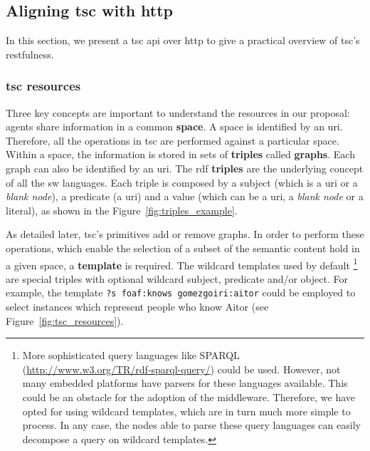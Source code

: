 \subsection{Aligning \acs{tsc} with \acs{http}}
\label{sec:align_tsc_http}


In this section, we present a \ac{tsc} \acs{api} over \ac{http} to give a practical overview of \ac{tsc}'s \acs{rest}fulness.

\subsubsection{\acs{tsc} resources}

Three key concepts are important to understand the resources in our proposal: agents share information in a common \textbf{space}.
A space is identified by an \acs{uri}.
Therefore, all the operations in \ac{tsc} are performed against a particular space.
Within a space, the information is stored in sets of \textbf{triples} called \textbf{graphs}.
Each graph can also be identified by an \acs{uri}.
The \acs{rdf} \textbf{triples} are the underlying concept of all the \ac{sw} languages.
Each triple is composed by a subject (which is a \acs{uri} or a \emph{blank node}), a predicate (a \acs{uri}) and a value (which can be a \acs{uri}, a \emph{blank node} or a literal), as shown in the Figure~\ref{fig:triples_example}.

As detailed later, \ac{tsc}'s primitives add or remove graphs.
In order to perform these operations, which enable the selection of a subset of the semantic content hold in a given space, a \textbf{template} is required. %
The wildcard templates used by default
\footnote{
  More sophisticated query languages like SPARQL (\url{http://www.w3.org/TR/rdf-sparql-query/}) could be used. %
  However, not many embedded platforms have parsers for these languages available.
  This could be an obstacle for the adoption of the middleware.
  Therefore, we have opted for using wildcard templates, which are in turn much more simple to process.
  In any case, the nodes able to parse these query languages can easily decompose a query on wildcard templates.
}
are special triples with optional wildcard subject, predicate and/or object.
For example, the template \texttt{?s foaf:knows gomezgoiri:aitor} could be employed to select instances which represent people who know Aitor (see Figure~\ref{fig:tsc_resources}).

